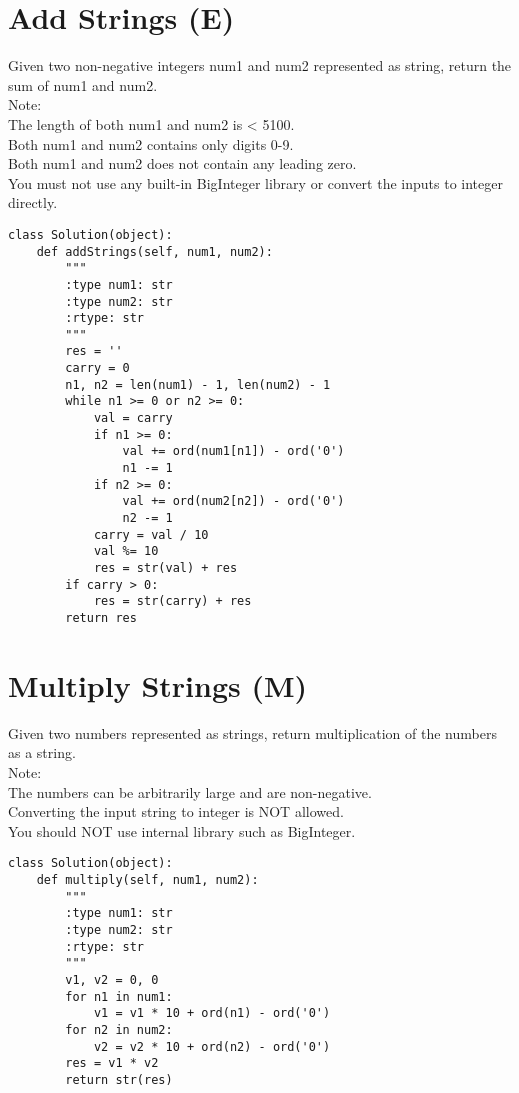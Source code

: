 \section{Add Strings (E)}
Given two non-negative integers num1 and num2 represented as string, return the sum of num1 and num2.\\

Note:\\
    The length of both num1 and num2 is < 5100.\\
    Both num1 and num2 contains only digits 0-9.\\
    Both num1 and num2 does not contain any leading zero.\\
    You must not use any built-in BigInteger library or convert the inputs to integer directly.\\
\begin{lstlisting}
class Solution(object):
    def addStrings(self, num1, num2):
        """
        :type num1: str
        :type num2: str
        :rtype: str
        """
        res = ''
        carry = 0
        n1, n2 = len(num1) - 1, len(num2) - 1
        while n1 >= 0 or n2 >= 0:
            val = carry
            if n1 >= 0: 
                val += ord(num1[n1]) - ord('0')
                n1 -= 1
            if n2 >= 0: 
                val += ord(num2[n2]) - ord('0')
                n2 -= 1
            carry = val / 10
            val %= 10
            res = str(val) + res
        if carry > 0:
            res = str(carry) + res
        return res
\end{lstlisting}

\section{Multiply Strings (M)}
Given two numbers represented as strings, return multiplication of the numbers as a string.\\

Note:\\
    The numbers can be arbitrarily large and are non-negative.\\
    Converting the input string to integer is NOT allowed.\\
    You should NOT use internal library such as BigInteger.\\

\begin{lstlisting}
class Solution(object):
    def multiply(self, num1, num2):
        """
        :type num1: str
        :type num2: str
        :rtype: str
        """
        v1, v2 = 0, 0
        for n1 in num1:
            v1 = v1 * 10 + ord(n1) - ord('0')
        for n2 in num2:
            v2 = v2 * 10 + ord(n2) - ord('0')
        res = v1 * v2
        return str(res)
\end{lstlisting}

